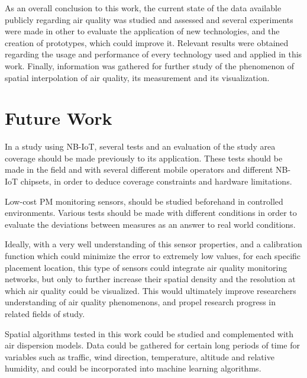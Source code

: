 As an overall conclusion to this work, the current state of the data available publicly regarding air quality was studied and assessed and several experiments were made in other to evaluate the application of new technologies, and the creation of prototypes, which could improve it. Relevant results were obtained regarding the usage and performance of every technology used and applied in this work. Finally, information was gathered for further study of the phenomenon of spatial interpolation of air quality, its measurement and its visualization.



\section{Future Work}

In a study using NB-IoT, several tests and an evaluation of the study area coverage should be made previously to its application. These tests should be made in the field and with several different mobile operators and different NB-IoT chipsets, in order to deduce coverage constraints and hardware limitations.

Low-cost PM monitoring sensors, should be studied beforehand in controlled environments. Various tests should be made with different conditions in order to evaluate the deviations between measures as an answer to real world conditions.

Ideally, with a very well understanding of this sensor properties, and a calibration function which could minimize the error to extremely low values, for each specific placement location, this type of sensors could integrate air quality monitoring networks, but only to further increase their spatial density and the resolution at which air quality could be visualized. This would ultimately improve researchers understanding of air quality phenomenons, and propel research progress in related fields of study.

Spatial algorithms tested in this work could be studied and complemented with air dispersion models. Data could be gathered for certain long periods of time for variables such as traffic, wind direction, temperature, altitude and relative humidity, and could be incorporated into machine learning algorithms.

